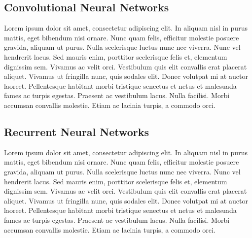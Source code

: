 \subsection{Convolutional Neural Networks}\label{sec:3.7.2}
\vspace{-0.5cm}
\noindent  Lorem ipsum dolor sit amet, consectetur adipiscing elit. In aliquam nisl in purus mattis, eget bibendum nisi ornare. Nunc quam felis, efficitur molestie posuere gravida, aliquam ut purus. Nulla scelerisque luctus nunc nec viverra. Nunc vel hendrerit lacus. Sed mauris enim, porttitor scelerisque felis et, elementum dignissim sem. Vivamus ac velit orci. Vestibulum quis elit convallis erat placerat aliquet. Vivamus ut fringilla nunc, quis sodales elit. Donec volutpat mi at auctor laoreet. Pellentesque habitant morbi tristique senectus et netus et malesuada fames ac turpis egestas. Praesent ac vestibulum lacus. Nulla facilisi. Morbi accumsan convallis molestie. Etiam ac lacinia turpis, a commodo orci.


\vspace{-0.3cm}


\subsection{Recurrent Neural Networks}\label{sec:3.7.3}
\vspace{-0.5cm}
\noindent  Lorem ipsum dolor sit amet, consectetur adipiscing elit. In aliquam nisl in purus mattis, eget bibendum nisi ornare. Nunc quam felis, efficitur molestie posuere gravida, aliquam ut purus. Nulla scelerisque luctus nunc nec viverra. Nunc vel hendrerit lacus. Sed mauris enim, porttitor scelerisque felis et, elementum dignissim sem. Vivamus ac velit orci. Vestibulum quis elit convallis erat placerat aliquet. Vivamus ut fringilla nunc, quis sodales elit. Donec volutpat mi at auctor laoreet. Pellentesque habitant morbi tristique senectus et netus et malesuada fames ac turpis egestas. Praesent ac vestibulum lacus. Nulla facilisi. Morbi accumsan convallis molestie. Etiam ac lacinia turpis, a commodo orci.


\vspace{-0.3cm}

